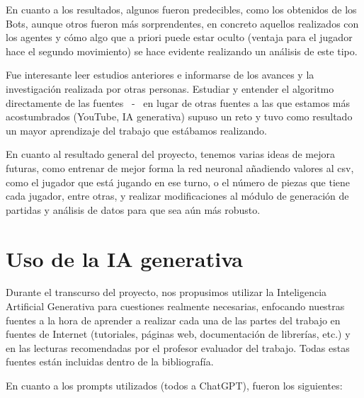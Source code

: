 \documentclass[conference,a4paper]{IEEEtran}
\begin{document}
En cuanto a los resultados, algunos fueron predecibles, como los obtenidos de los Bots,
aunque otros fueron más sorprendentes, en concreto aquellos realizados con los agentes
y cómo algo que a priori puede estar oculto (ventaja para el jugador hace el segundo
movimiento) se hace evidente realizando un análisis de este tipo.

Fue interesante leer estudios anteriores e informarse de los avances y la investigación
realizada por otras personas. Estudiar y entender el algoritmo directamente de las fuentes
~\cite{b8}-~\cite{b9} en lugar de otras fuentes a las que estamos más acostumbrados (YouTube,
IA generativa) supuso un reto y tuvo como resultado un mayor aprendizaje del trabajo que
estábamos realizando.

En cuanto al resultado general del proyecto, tenemos varias ideas de mejora futuras, como 
entrenar de mejor forma la red neuronal añadiendo valores al csv, como el jugador que está
jugando en ese turno, o el número de piezas que tiene cada jugador, entre otras, y realizar
modificaciones al módulo de generación de partidas y análisis de datos para que sea aún
más robusto.

\section{Uso de la IA generativa}

Durante el transcurso del proyecto, nos propusimos utilizar la Inteligencia
Artificial Generativa para cuestiones realmente necesarias, enfocando nuestras
fuentes a la hora de aprender a realizar cada una de las partes del trabajo en
fuentes de Internet (tutoriales, páginas web, documentación de librerías, etc.)
y en las lecturas recomendadas por el profesor evaluador del trabajo. Todas estas 
fuentes están incluidas dentro de la bibliografía.

En cuanto a los prompts utilizados (todos a ChatGPT), fueron los siguientes:
\end{document}
